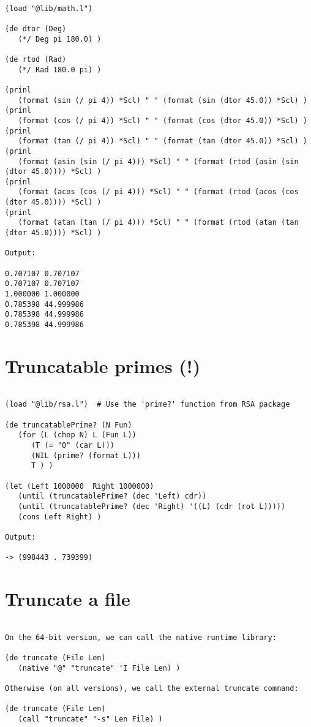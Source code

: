 \begin{verbatim}

(load "@lib/math.l")

(de dtor (Deg)
   (*/ Deg pi 180.0) )

(de rtod (Rad)
   (*/ Rad 180.0 pi) )

(prinl
   (format (sin (/ pi 4)) *Scl) " " (format (sin (dtor 45.0)) *Scl) )
(prinl
   (format (cos (/ pi 4)) *Scl) " " (format (cos (dtor 45.0)) *Scl) )
(prinl
   (format (tan (/ pi 4)) *Scl) " " (format (tan (dtor 45.0)) *Scl) )
(prinl
   (format (asin (sin (/ pi 4))) *Scl) " " (format (rtod (asin (sin (dtor 45.0)))) *Scl) )
(prinl
   (format (acos (cos (/ pi 4))) *Scl) " " (format (rtod (acos (cos (dtor 45.0)))) *Scl) )
(prinl
   (format (atan (tan (/ pi 4))) *Scl) " " (format (rtod (atan (tan (dtor 45.0)))) *Scl) )

Output:

0.707107 0.707107
0.707107 0.707107
1.000000 1.000000
0.785398 44.999986
0.785398 44.999986
0.785398 44.999986

\end{verbatim}

\section*{Truncatable primes (!)}

\begin{verbatim}

(load "@lib/rsa.l")  # Use the 'prime?' function from RSA package

(de truncatablePrime? (N Fun)
   (for (L (chop N) L (Fun L))
      (T (= "0" (car L)))
      (NIL (prime? (format L)))
      T ) )

(let (Left 1000000  Right 1000000)
   (until (truncatablePrime? (dec 'Left) cdr))
   (until (truncatablePrime? (dec 'Right) '((L) (cdr (rot L)))))
   (cons Left Right) )

Output:

-> (998443 . 739399)

\end{verbatim}

\section*{Truncate a file}

\begin{verbatim}

On the 64-bit version, we can call the native runtime library:

(de truncate (File Len)
   (native "@" "truncate" 'I File Len) )

Otherwise (on all versions), we call the external truncate command:

(de truncate (File Len)
   (call "truncate" "-s" Len File) )

\end{verbatim}

